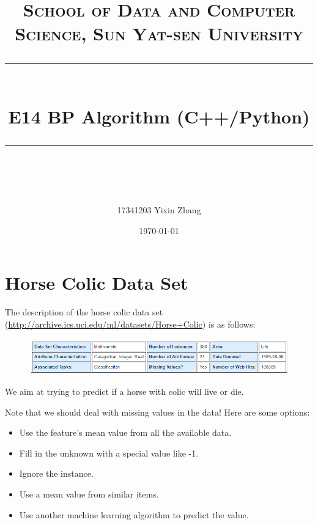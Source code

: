 \documentclass[a4paper, 11pt]{article}
\title{	
\normalfont \normalsize
\textsc{School of Data and Computer Science, Sun Yat-sen University} \\ [25pt] %
\rule{\textwidth}{0.5pt} \\[0.4cm] %
\huge  E14 BP Algorithm (C++/Python)\\ %
\rule{\textwidth}{2pt} \\[0.5cm] %
\author{17341203 Yixin Zhang}
\date{\normalsize\today}
}
\begin{document}
\maketitle
\tableofcontents
\newpage
\section{Horse Colic Data Set}
The description of the horse colic data set (\url{http://archive.ics.uci.edu/ml/datasets/Horse+Colic}) is as follows:
\begin{figure}[ht]
\centering
\includegraphics[width=15cm]{horse}
\end{figure}

We aim at trying to predict if a horse with colic will live or die.

Note that we should deal with missing values in the data! Here are some options:
\begin{itemize}
	\item Use the feature’s mean value from all the available data.
	\item Fill in the unknown with a special value like -1.
	\item Ignore the instance.
	\item Use a mean value from similar items.
	\item Use another machine learning algorithm to predict the value.
\end{itemize}
\end{document}
